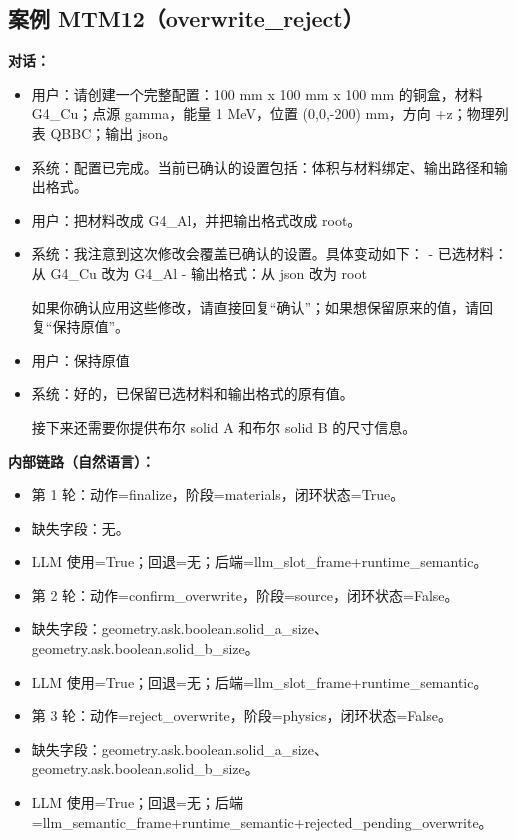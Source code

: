\documentclass[11pt]{ctexart}
\begin{document}
\subsection{案例 MTM12（overwrite\_reject）}
\textbf{对话：}
\begin{itemize}
\item 用户：请创建一个完整配置：100 mm x 100 mm x 100 mm 的铜盒，材料 G4\_Cu；点源 gamma，能量 1 MeV，位置 (0,0,-200) mm，方向 +z；物理列表 QBBC；输出 json。
\item 系统：配置已完成。当前已确认的设置包括：体积与材料绑定、输出路径和输出格式。
\item 用户：把材料改成 G4\_Al，并把输出格式改成 root。
\item 系统：我注意到这次修改会覆盖已确认的设置。具体变动如下：  
- 已选材料：从 G4\_Cu 改为 G4\_Al  
- 输出格式：从 json 改为 root  

如果你确认应用这些修改，请直接回复“确认”；如果想保留原来的值，请回复“保持原值”。
\item 用户：保持原值
\item 系统：好的，已保留已选材料和输出格式的原有值。

接下来还需要你提供布尔 solid A 和布尔 solid B 的尺寸信息。
\end{itemize}
\textbf{内部链路（自然语言）：}
\begin{itemize}
\item 第 1 轮：动作=finalize，阶段=materials，闭环状态=True。
\item 缺失字段：无。
\item LLM 使用=True；回退=无；后端=llm\_slot\_frame+runtime\_semantic。
\item 第 2 轮：动作=confirm\_overwrite，阶段=source，闭环状态=False。
\item 缺失字段：geometry.ask.boolean.solid\_a\_size、geometry.ask.boolean.solid\_b\_size。
\item LLM 使用=True；回退=无；后端=llm\_slot\_frame+runtime\_semantic。
\item 第 3 轮：动作=reject\_overwrite，阶段=physics，闭环状态=False。
\item 缺失字段：geometry.ask.boolean.solid\_a\_size、geometry.ask.boolean.solid\_b\_size。
\item LLM 使用=True；回退=无；后端=llm\_semantic\_frame+runtime\_semantic+rejected\_pending\_overwrite。
\end{itemize}
\end{document}
